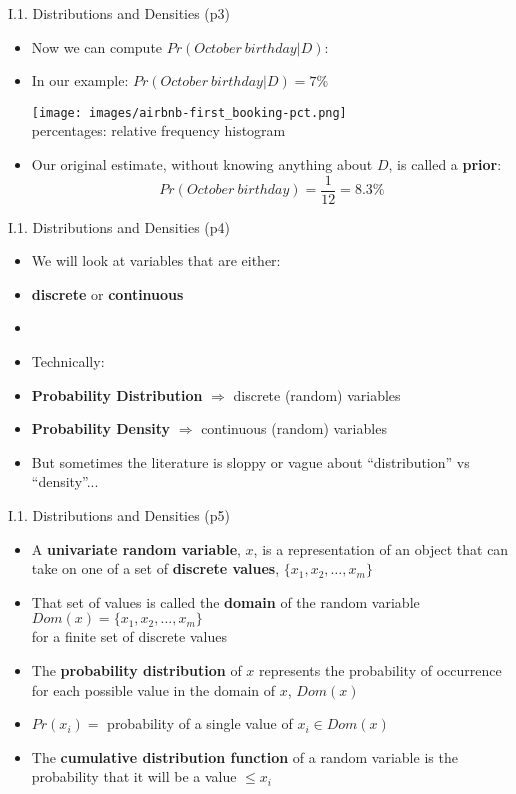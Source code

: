 \documentclass[handout]{beamer}
\newcommand{\strong}[1]{\textbf{\color{teal} #1}}
\newcommand{\stronger}[1]{\textbf{\color{purple} #1}}
\begin{document}
\begin{frame}{I.1. Distributions and Densities (p3)}
\begin{itemize}
\item Now we can compute $Pr(October~birthday|D)$: 
\item In our example: $Pr(October~birthday|D)=7\%$
\begin{center}
\texttt{[image: images/airbnb-first\_booking-pct.png]}\\
{\footnotesize percentages: relative frequency histogram}
\end{center}
\item Our original estimate, without knowing anything about $D$, is called a \strong{prior}:
\[
Pr(October ~ birthday) = \frac{1}{12} = 8.3\%
\]
\end{itemize}
\end{frame}
\begin{frame}{I.1. Distributions and Densities (p4)}
\begin{itemize}
\item We will look at variables that are either:
\item[] \stronger{discrete} or \stronger{continuous}
\item[]
\item Technically:
\item[] \stronger{Probability Distribution} $\Rightarrow$ discrete (random) variables
\item[] \stronger{Probability Density} $\Rightarrow$ continuous (random) variables
\item But sometimes the literature is sloppy or vague about ``distribution'' vs ``density''...
\end{itemize}
\end{frame}
\begin{frame}{I.1. Distributions and Densities (p5)}
\begin{itemize}
\item A \strong{univariate random variable}, $x$, is a representation of an object that can take on one of a set of \strong{discrete values}, $\{x_1, x_2, \ldots, x_m \}$
\item That set of values is called the \strong{domain} of the random variable\\
$Dom(x) = \{x_1, x_2, \ldots, x_m \}$\\
for a finite set of discrete values
\item The \stronger{probability distribution} of $x$ represents the probability of occurrence for each possible value in the domain of $x$, $Dom(x)$
\item $Pr(x_i) = $ probability of a single value of $x_i \in Dom(x)$
\item The \stronger{cumulative distribution function} of a random variable is the probability that it will be a value $\le x_i$
\end{itemize}
\end{frame}
\end{document}

